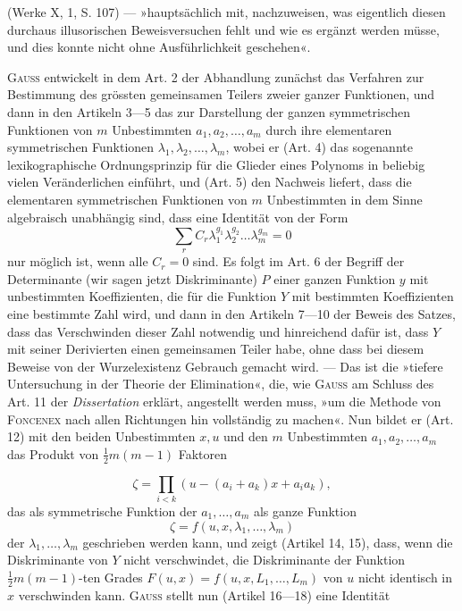 (Werke X, 1, S. 107) — »hauptsächlich mit, nachzuweisen, was eigentlich diesen
durchaus illusorischen Beweisversuchen fehlt und wie es ergänzt werden müsse,
und dies konnte nicht ohne Ausführlichkeit geschehen«.
\par
\textsc{Gauss} entwickelt in dem Art. 2 der Abhandlung zunächst das Verfahren
zur Bestimmung des grössten gemeinsamen Teilers zweier ganzer Funktionen,
und dann in den Artikeln 3—5 das zur Darstellung der ganzen symmetrischen
Funktionen von \(m\) Unbestimmten \(a_1,a_2,\ldots,a_m\) durch ihre elementaren symmetrischen
Funktionen \(\lambda_1,\lambda_2,\ldots,\lambda_m\), wobei er (Art. 4) das sogenannte lexikographische
Ordnungsprinzip für die Glieder eines Polynoms in beliebig vielen Veränderlichen
einführt, und (Art. 5) den Nachweis liefert, dass die elementaren symmetrischen
Funktionen von \(m\) Unbestimmten in dem Sinne algebraisch unabhängig
sind, dass eine Identität von der Form
\[
\sum_r C_r\lambda_1^{g_1}\lambda_2^{g_2}\ldots\lambda_m^{g_m}=0
\]
nur möglich ist, wenn alle \(C_r=0\) sind. Es folgt im Art. 6 der Begriff der
Determinante (wir sagen jetzt Diskriminante) \(P\) einer ganzen Funktion \(y\) mit
unbestimmten Koeffizienten, die für die Funktion \(Y\) mit bestimmten Koeffizienten
eine bestimmte Zahl wird, und dann in den Artikeln 7—10 der Beweis
des Satzes, dass das Verschwinden dieser Zahl notwendig und hinreichend
dafür ist, dass \(Y\) mit seiner Derivierten einen gemeinsamen Teiler habe, ohne
dass bei diesem Beweise von der Wurzelexistenz Gebrauch gemacht wird.
— Das ist die »tiefere Untersuchung in der Theorie der Elimination«, die,
wie \textsc{Gauss} am Schluss des Art. 11 der \textit{Dissertation} erklärt, angestellt werden
muss, »um die Methode von \textsc{Foncenex} nach allen Richtungen hin vollständig
zu machen«. Nun bildet er (Art. 12) mit den beiden Unbestimmten \(x,u\) und
den \(m\) Unbestimmten \(a_1,a_2,\ldots,a_m\) das Produkt von \(\tfrac12m(m-1)\) Faktoren\par
\clearpage{}
\[
\zeta=\prod_{i<k}(u-(a_i+a_k)x+a_ia_k),
\]
\noindent das als symmetrische Funktion der \(a_1,\ldots,a_m\) als ganze Funktion
\[
\zeta=f(u,x,\lambda_1,\ldots,\lambda_m)
\]
der \(\lambda_1,\ldots,\lambda_m\) geschrieben werden kann, und zeigt (Artikel 14, 15), dass, wenn
die Diskriminante von \(Y\) nicht verschwindet, die Diskriminante der Funktion
\(\tfrac12m(m-1)\)-ten Grades \(F(u,x)=f(u,x,L_1,\ldots,L_m)\) von \(u\) nicht identisch
in \(x\) verschwinden kann. \textsc{Gauss} stellt nun (Artikel 16—18) eine Identität
